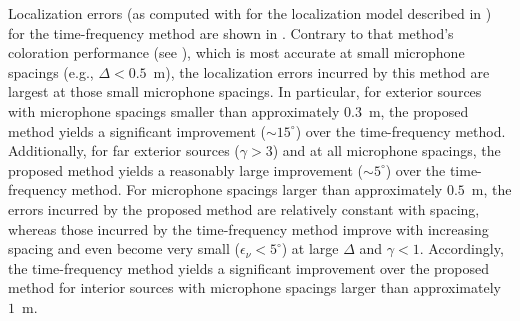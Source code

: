 Localization errors (as computed with  for the localization model described in ) for the time-frequency method are shown in .
Contrary to that method's coloration performance (see ), which is most accurate at small microphone spacings (e.g., $\Delta < 0.5$~m), the localization errors incurred by this method are largest at those small microphone spacings.
In particular, for exterior sources with microphone spacings smaller than approximately $0.3$~m, the proposed method yields a significant improvement ($\sim15^\circ$) over the time-frequency method.
Additionally, for far exterior sources ($\gamma > 3$) and at all microphone spacings, the proposed method yields a reasonably large improvement ($\sim5^\circ$) over the time-frequency method.
For microphone spacings larger than approximately $0.5$~m, the errors incurred by the proposed method are relatively constant with spacing, whereas those incurred by the time-frequency method improve with increasing spacing and even become very small ($\epsilon_\nu < 5^\circ$) at large $\Delta$ and $\gamma < 1$.
Accordingly, the time-frequency method yields a significant improvement over the proposed method for interior sources with microphone spacings larger than approximately $1$~m.

